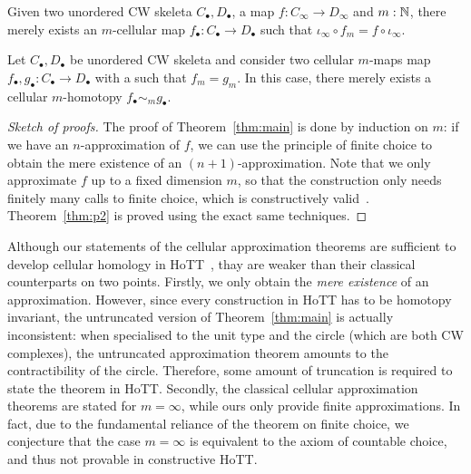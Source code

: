 \documentclass{easychair}
\begin{document}
\begin{theorem}\label{thm:main}
  Given two unordered CW skeleta $C_\bullet,D_\bullet$, a map $f : C_\infty \to  D_\infty$ and
  $m:\mathbb{N}$, there merely exists an $m$-cellular map $f_\bullet : C_\bullet \to D_{\bullet}$ such that
  $\iota_{\infty} \circ f_m = f \circ \iota_{\infty}$.
\end{theorem}

\begin{theorem}\label{thm:p2}
  Let $C_\bullet,D_\bullet$ be unordered CW skeleta and consider two
  cellular $m$-maps map $f_\bullet,g_\bullet : C_\bullet \to D_\bullet$ with a
  such that $f_m = g_m$. In this case, there merely exists a
  cellular $m$-homotopy $f_\bullet \sim_m g_\bullet$.
\end{theorem}

\begin{proof}[Sketch of proofs]
The proof of Theorem~\ref{thm:main} is done by induction on \( m \):
%
if we have an \( n \)-approximation of \( f \), we can use the principle of finite choice to obtain
the mere existence of an \( (n+1) \)-approximation.
%
Note that we only approximate \( f \) up to a fixed dimension \( m \), so that the construction
only needs finitely many calls to finite choice, which is constructively valid~\cite[exercise 3.22]{HoTT13}.
%
Theorem~\ref{thm:p2} is proved using the exact same techniques.
\end{proof}

Although our statements of the cellular approximation theorems are sufficient to develop cellular homology in HoTT~\cite{CellHomology}, thay are weaker than their classical counterparts on two
points.
%
Firstly, we only obtain the \emph{mere existence} of an approximation. However, since every
construction in HoTT has to be homotopy invariant, the untruncated version of Theorem~\ref{thm:main} is actually
inconsistent: when specialised to the unit type and the circle (which are both CW complexes),
the untruncated approximation theorem amounts to the contractibility of the circle.
Therefore, some amount of truncation is required to state the theorem in HoTT.
%
Secondly, the classical cellular approximation theorems are stated for \( m = \infty \), while
ours only provide finite approximations.
%
In fact, due to the fundamental reliance of the theorem on finite choice, we conjecture that the
case \( m = \infty \) is equivalent to the axiom of countable choice, and thus not provable in
constructive HoTT.
\end{document}
